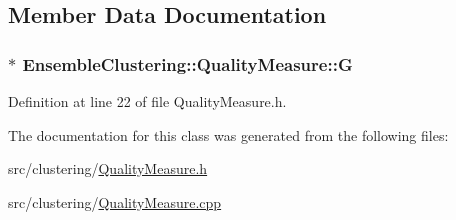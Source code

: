 \subsection{Member Data Documentation}
\hypertarget{class_ensemble_clustering_1_1_quality_measure_a8639730658036901338b34bc59bf4cec}{
\subsubsection[{G}]{$\ast$ Ensemble\-Clustering\-::\-Quality\-Measure\-::\-G\hspace{0.3cm}{\ttfamily [protected]}}}\label{class_ensemble_clustering_1_1_quality_measure_a8639730658036901338b34bc59bf4cec}


Definition at line 22 of file Quality\-Measure.\-h.



The documentation for this class was generated from the following files\-:\begin{DoxyCompactItemize}
\item 
src/clustering/\hyperlink{_quality_measure_8h}{Quality\-Measure.\-h}\item 
src/clustering/\hyperlink{_quality_measure_8cpp}{Quality\-Measure.\-cpp}\end{DoxyCompactItemize}
